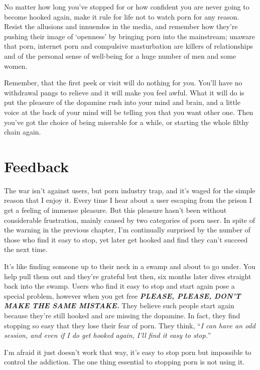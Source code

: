 \documentclass[
]{book}
\begin{document}
No matter how long you've stopped for or how confident you are never going to become hooked again, make it rule for life not to watch porn for any reason. Resist the allusions and innuendos in the media, and remember how they're pushing their image of `openness' by bringing porn into the mainstream; unaware that porn, internet porn and compulsive masturbation are killers of relationships and of the personal sense of well-being for a huge number of men and some women.

Remember, that the first peek or visit will do nothing for you. You'll have no withdrawal pangs to relieve and it will make you feel awful. What it will do is put the pleasure of the dopamine rush into your mind and brain, and a little voice at the back of your mind will be telling you that you want other one. Then you've got the choice of being miserable for a while, or starting the whole filthy chain again.

\hypertarget{feedback}{%
\chapter{Feedback}\label{feedback}}

The war isn't against users, but porn industry trap, and it's waged for the simple reason that I enjoy it. Every time I hear about a user escaping from the prison I get a feeling of immense pleasure. But this pleasure hasn't been without considerable frustration, mainly caused by two categories of porn user. In spite of the warning in the previous chapter, I'm continually surprised by the number of those who find it easy to stop, yet later get hooked and find they can't succeed the next time.

It's like finding someone up to their neck in a swamp and about to go under. You help pull them out and they're grateful but then, six months later dives straight back into the swamp. Users who find it easy to stop and start again pose a special problem, however when you get free \textbf{\emph{PLEASE, PLEASE, DON'T MAKE THE SAME MISTAKE.}} They believe such people start again because they're still hooked and are missing the dopamine. In fact, they find stopping so easy that they lose their fear of porn. They think, ``\emph{I can have an odd session, and even if I do get hooked again, I'll find it easy to stop.}''

I'm afraid it just doesn't work that way, it's easy to stop porn but impossible to control the addiction. The one thing essential to stopping porn is not using it.
\end{document}

